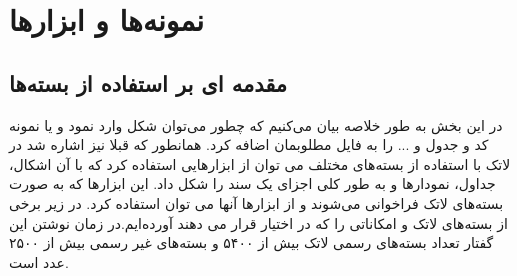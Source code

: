 \chapter{نمونه‌ها و ابزار‌ها}\label{chp:chap3}
\thispagestyle{empty}
\section{مقدمه ای بر استفاده از بسته‌ها}\label{seq3.1}
در این بخش به طور خلاصه بیان می‌کنیم که چطور می‌توان شکل وارد نمود و یا نمونه کد و جدول و ... را به فایل مطلوبمان اضافه کرد. همانطور که قبلا نیز اشاره شد در لاتک با استفاده از بسته‌های مختلف می توان از ابزار‌هایی استفاده کرد که با آن اشکال، جداول، نمودارها و به طور کلی اجزای یک سند را شکل داد. این ابزارها که به صورت بسته‌های لاتک فراخوانی می‌شوند و از ابزار‌ها آنها می توان استفاده کرد. در زیر برخی از بسته‌های لاتک و امکاناتی را که در اختیار قرار می دهند آورده‌ایم.در زمان نوشتن این گفتار تعداد بسته‌های رسمی لاتک بیش از ۵۴۰۰ و بسته‌های غیر رسمی بیش از ۲۵۰۰ عدد است.
